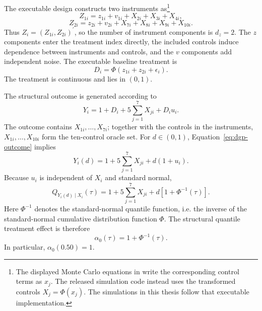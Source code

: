 The executable design constructs two instruments as\footnote{The displayed Monte Carlo equations in \textcite{chen_huang_tien_2021} write the corresponding control terms as $x_j$. The released simulation code instead uses the transformed controls $X_j=\Phi(x_j)$. The simulations in this thesis follow that executable implementation.}
\begin{equation}
  Z_{1i}=z_{1i}+v_{1i}+X_{2i}+X_{3i}+X_{4i},
  \label{eq:dgp-instrument1}
\end{equation}
\begin{equation}
  Z_{2i}=z_{2i}+v_{2i}+X_{7i}+X_{8i}+X_{9i}+X_{10i}.
  \label{eq:dgp-instrument2}
\end{equation}
Thus $Z_i=(Z_{1i},Z_{2i})^{\prime}$, so the number of instrument components is $d_z=2$. The $z$ components enter the treatment index directly, the included controls induce dependence between instruments and controls, and the $v$ components add independent noise. The executable baseline treatment is
\begin{equation}
  D_i=\Phi(z_{1i}+z_{2i}+\epsilon_i).
  \label{eq:dgp-treatment-baseline}
\end{equation}
The treatment is continuous and lies in $(0,1)$.

The structural outcome is generated according to
\begin{equation}
  Y_i=1+D_i+5\sum_{j=1}^{7}X_{ji}+D_i u_i.
  \label{eq:dgp-outcome}
\end{equation}
The outcome contains $X_{1i},\ldots,X_{7i}$; together with the controls in the instruments, $X_{1i},\ldots,X_{10i}$ form the ten-control oracle set. For $d\in(0,1)$, Equation~\eqref{eq:dgp-outcome} implies
\begin{equation}
  Y_i(d)=1+5\sum_{j=1}^{7}X_{ji}+d(1+u_i).
  \label{eq:dgp-potential-outcome}
\end{equation}
Because $u_i$ is independent of $X_i$ and standard normal,
\begin{equation}
  Q_{Y_i(d)\mid X_i}(\tau)
  =1+5\sum_{j=1}^{7}X_{ji}
  +d\left[1+\Phi^{-1}(\tau)\right].
  \label{eq:dgp-structural-quantile}
\end{equation}
Here $\Phi^{-1}$ denotes the standard-normal quantile function, i.e. the inverse of the standard-normal cumulative distribution function $\Phi$. The structural quantile treatment effect is therefore
\begin{equation}
  \alpha_0(\tau)=1+\Phi^{-1}(\tau).
  \label{eq:dgp-alpha-true}
\end{equation}
In particular, $\alpha_0(0.50)=1$.

